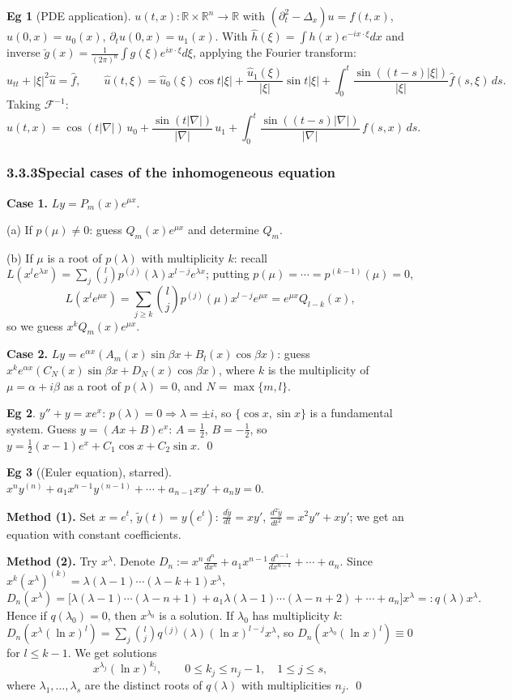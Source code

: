 \documentclass[11pt]{article}
\theoremstyle{definition}
\newtheorem*{example}{Eg}
\theoremstyle{remark}
\newcommand{\R}{\mathbb{R}}
\newcommand{\subsecn}[1]{\subsubsection*{#1}}
\begin{document}
\begin{example}[PDE application]
$u(t,x):\R\times\R^n\to\R$ with $(\partial_t^2-\Delta_x)u=f(t,x)$, $u(0,x)=u_0(x)$,
$\partial_tu(0,x)=u_1(x)$. With $\hat{h}(\xi)=\int h(x)e^{-ix\cdot\xi}dx$ and inverse
$\breve{g}(x)=\frac{1}{(2\pi)^n}\int g(\xi)e^{ix\cdot\xi}d\xi$, applying the Fourier transform:
\[
\hat{u}_{tt}+|\xi|^2\hat{u}=\hat{f}, \qquad
\hat{u}(t,\xi)=\hat{u}_0(\xi)\cos t|\xi|+\frac{\hat{u}_1(\xi)}{|\xi|}\sin t|\xi|+\int_0^{t}\frac{\sin((t-s)|\xi|)}{|\xi|}\hat{f}(s,\xi)\,ds.
\]
Taking $\mathcal{F}^{-1}$:
\[
u(t,x)=\cos(t|\nabla|)\,u_0+\frac{\sin(t|\nabla|)}{|\nabla|}\,u_1+\int_0^{t}\frac{\sin((t-s)|\nabla|)}{|\nabla|}\,f(s,x)\,ds.
\]
\end{example}

\subsecn{3.3.3\quad Special cases of the inhomogeneous equation}

\textbf{Case 1.} $Ly=P_m(x)e^{\mu x}$.

(a) If $p(\mu)\neq0$: guess $Q_m(x)e^{\mu x}$ and determine $Q_m$.

(b) If $\mu$ is a root of $p(\lambda)$ with multiplicity $k$: recall
$L(x^le^{\lambda x})=\sum_j \binom{l}{j} p^{(j)}(\lambda)x^{l-j}e^{\lambda x}$; putting
$p(\mu)=\cdots=p^{(k-1)}(\mu)=0$,
\[
L(x^le^{\mu x})=\sum_{j\ge k}\binom{l}{j}p^{(j)}(\mu)x^{l-j}e^{\mu x}=e^{\mu x}Q_{l-k}(x),
\]
so we guess $x^kQ_m(x)e^{\mu x}$.

\textbf{Case 2.} $Ly=e^{\alpha x}(A_m(x)\sin\beta x+B_l(x)\cos\beta x)$: guess
$x^ke^{\alpha x}(C_N(x)\sin\beta x+D_N(x)\cos\beta x)$, where $k$ is the multiplicity of
$\mu=\alpha+i\beta$ as a root of $p(\lambda)=0$, and $N=\max\{m,l\}$.

\begin{example}
$y''+y=xe^x$: $p(\lambda)=0 \Rightarrow \lambda=\pm i$, so $\{\cos x,\sin x\}$ is a fundamental
system. Guess $y=(Ax+B)e^x$: $A=\frac12$, $B=-\frac12$, so
$y=\frac12(x-1)e^x+C_1\cos x+C_2\sin x$. \qed
\end{example}

\begin{example}[(Euler equation), starred]
$x^ny^{(n)}+a_1x^{n-1}y^{(n-1)}+\cdots+a_{n-1}xy'+a_ny=0$.

\textbf{Method (1).} Set $x=e^t$, $\tilde{y}(t)=y(e^t)$:
$\frac{d\tilde{y}}{dt}=xy'$, $\frac{d^2\tilde{y}}{dt^2}=x^2y''+xy'$; we get an equation with
constant coefficients.

\textbf{Method (2).} Try $x^{\lambda}$. Denote
$D_n:=x^n\frac{d^n}{dx^n}+a_1x^{n-1}\frac{d^{n-1}}{dx^{n-1}}+\cdots+a_n$. Since
$x^k(x^\lambda)^{(k)}=\lambda(\lambda-1)\cdots(\lambda-k+1)x^{\lambda}$,
\[
D_n(x^{\lambda})=\bigl[\lambda(\lambda-1)\cdots(\lambda-n+1)+a_1\lambda(\lambda-1)\cdots(\lambda-n+2)+\cdots+a_n\bigr]x^{\lambda}=:q(\lambda)x^{\lambda}.
\]
Hence if $q(\lambda_0)=0$, then $x^{\lambda_0}$ is a solution. If $\lambda_0$ has multiplicity $k$:
$D_n(x^{\lambda}(\ln x)^l)=\sum_j\binom{l}{j}q^{(j)}(\lambda)(\ln x)^{l-j}x^{\lambda}$, so
$D_n(x^{\lambda_0}(\ln x)^l)\equiv0$ for $l\le k-1$. We get solutions
\[
x^{\lambda_j}(\ln x)^{k_j}, \qquad 0\le k_j\le n_j-1,\quad 1\le j\le s,
\]
where $\lambda_1,\dots,\lambda_s$ are the distinct roots of $q(\lambda)$ with multiplicities $n_j$. \qed
\end{example}
\end{document}
